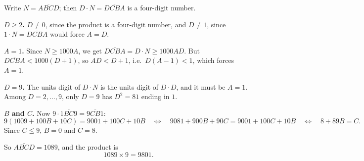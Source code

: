 Write $N=\overline{ABCD}$; then $D\cdot N=\overline{DCBA}$ is a four-digit number.

\textbf{$D\ge2$.} $D\ne0$, since the product is a four-digit number, and $D\ne1$, since $1\cdot N=\overline{DCBA}$ would force $A=D$.

\textbf{$A=1$.} Since $N\ge1000A$, we get $\overline{DCBA}=D\cdot N\ge1000AD$. But $\overline{DCBA}<1000(D+1)$, so $AD<D+1$, i.e.\ $D(A-1)<1$, which forces $A=1$.

\textbf{$D=9$.} The units digit of $D\cdot N$ is the units digit of $D\cdot D$, and it must be $A=1$. Among $D=2,\dots,9$, only $D=9$ has $D^2=81$ ending in $1$.

\textbf{$B$ and $C$.} Now $9\cdot\overline{1BC9}=\overline{9CB1}$:
\[
9(1009+100B+10C)=9001+100C+10B
\quad\Longleftrightarrow\quad 9081+900B+90C=9001+100C+10B
\quad\Longleftrightarrow\quad 8+89B=C .
\]
Since $C\le9$, $B=0$ and $C=8$.

So $\overline{ABCD}=1089$, and the product is
\[
1089\times9=\boxed{9801}.
\]
